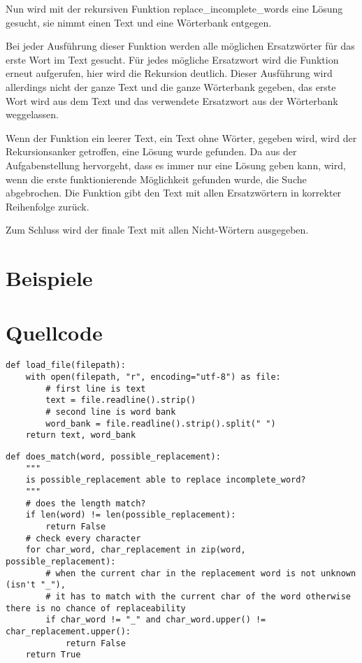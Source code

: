 \documentclass[a4paper,10pt,ngerman]{scrartcl}
\begin{document}
Nun wird mit der rekursiven Funktion replace\_incomplete\_words eine Lösung gesucht, sie nimmt einen Text und eine Wörterbank entgegen.

Bei jeder Ausführung dieser Funktion werden alle möglichen Ersatzwörter für das erste Wort im Text gesucht.
Für jedes mögliche Ersatzwort wird die Funktion erneut aufgerufen, hier wird die Rekursion deutlich.
Dieser Ausführung wird allerdings nicht der ganze Text und die ganze Wörterbank gegeben, das erste Wort wird aus dem Text und das verwendete Ersatzwort aus der Wörterbank weggelassen.

Wenn der Funktion ein leerer Text, ein Text ohne Wörter, gegeben wird, wird der Rekursionsanker getroffen, eine Lösung wurde gefunden.
Da aus der Aufgabenstellung hervorgeht, dass es immer nur eine Lösung geben kann, wird, wenn die erste funktionierende Möglichkeit gefunden wurde, die Suche abgebrochen.
Die Funktion gibt den Text mit allen Ersatzwörtern in korrekter Reihenfolge zurück.

Zum Schluss wird der finale Text mit allen Nicht-Wörtern ausgegeben.

\section{Beispiele}

\section{Quellcode}

\begin{lstlisting}
def load_file(filepath):
    with open(filepath, "r", encoding="utf-8") as file:
        # first line is text
        text = file.readline().strip()
        # second line is word bank
        word_bank = file.readline().strip().split(" ")
    return text, word_bank
\end{lstlisting}

\begin{lstlisting}
def does_match(word, possible_replacement):
    """
    is possible_replacement able to replace incomplete_word?
    """
    # does the length match?
    if len(word) != len(possible_replacement):
        return False
    # check every character
    for char_word, char_replacement in zip(word, possible_replacement):
        # when the current char in the replacement word is not unknown (isn't "_"),
        # it has to match with the current char of the word otherwise there is no chance of replaceability
        if char_word != "_" and char_word.upper() != char_replacement.upper():
            return False
    return True
\end{lstlisting}
\end{document}
